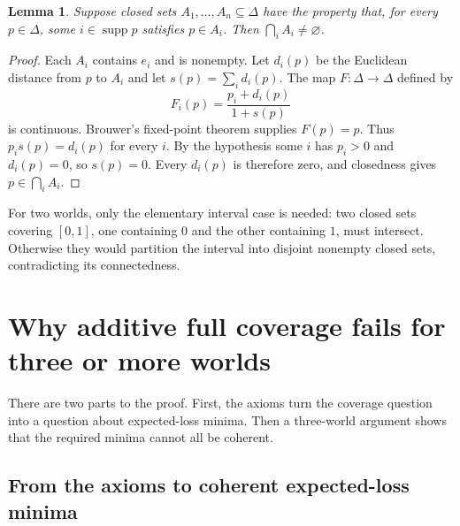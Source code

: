 \documentclass[11pt]{article}
\newtheorem{lemma}[theorem]{Lemma}
\theoremstyle{remark}
\newcommand{\supp}{\operatorname{supp}}
\begin{document}
\begin{lemma}\label{lem:kkm}
Suppose closed sets $A_1,\ldots,A_n\subseteq\Delta$ have the property that,
for every $p\in\Delta$, some $i\in\supp p$ satisfies $p\in A_i$.
Then $\bigcap_iA_i\ne\varnothing$.
\end{lemma}
\begin{proof}
Each $A_i$ contains $e_i$ and is nonempty. Let $d_i(p)$ be the Euclidean
distance from $p$ to $A_i$ and let $s(p)=\sum_i d_i(p)$.
The map $F:\Delta\to\Delta$ defined by
\[
 F_i(p)=\frac{p_i+d_i(p)}{1+s(p)}
\]
is continuous. Brouwer's fixed-point theorem supplies $F(p)=p$.
Thus $p_i s(p)=d_i(p)$ for every $i$. By the hypothesis some $i$ has
$p_i>0$ and $d_i(p)=0$, so $s(p)=0$. Every $d_i(p)$ is therefore zero,
and closedness gives $p\in\bigcap_iA_i$.
\end{proof}

For two worlds, only the elementary interval case is needed: two closed sets
covering $[0,1]$, one containing $0$ and the other containing $1$, must intersect.
Otherwise they would partition the interval into disjoint nonempty closed
sets, contradicting its connectedness.

\section{Why additive full coverage fails for three or more worlds}\label{app:obstruction}

There are two parts to the proof. First, the axioms turn the coverage question
into a question about expected-loss minima. Then a three-world argument
shows that the required minima cannot all be coherent.

\subsection*{From the axioms to coherent expected-loss minima}
\end{document}
